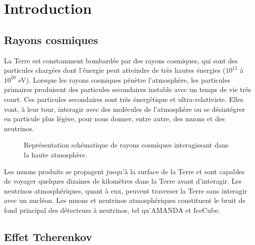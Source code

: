 \section{Introduction}

\subsection{Rayons cosmiques}
La Terre est constamment bombardée par des rayons cosmiques, qui sont des particules chargées dont l'énergie peut atteindre de très hautes énergies ($10^{15}$ à $10^{20}$ eV). Lorsque les rayons cosmiques pénètre l'atmosphère, les particules primaires produisent des particules secondaires instable avec un temps de vie très court. Ces particules secondaires sont très énergétique et ultra-relativiste. Elles vont, à leur tour, interagir avec des molécules de l'atmosphère ou se désintégrer en particule plus légère, pour nous donner, entre autre, des muons et des neutrinos.\\

\begin{figure}[h!]
    \caption{\label{fig:CR} Représentation schématique de rayons cosmiques interagissant dans la haute atmosphère.}
\end{figure}

Les muons produits se propagent jusqu'à la surface de la Terre et sont capables de voyager quelques dizaines de kilomètres dans la Terre avant d'interagir. Les neutrinos atmosphériques, quant à eux, peuvent traverser la Terre sans interagir avec un nucléon. Les muons et neutrinos atmosphériques constituent le bruit de fond principal des détecteurs à neutrinos, tel qu'AMANDA et IceCube.

\subsection{Effet Tcherenkov}

